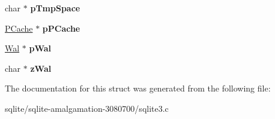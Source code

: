 \begin{DoxyCompactItemize}
\item 
\hypertarget{struct_pager_a64934188c72599e0be9ae54d3fc1cc92}{char $\ast$ {\bfseries p\+Tmp\+Space}}\label{struct_pager_a64934188c72599e0be9ae54d3fc1cc92}

\item 
\hypertarget{struct_pager_ae2495e45e354e92a858144386f91cab3}{\hyperlink{struct_p_cache}{P\+Cache} $\ast$ {\bfseries p\+P\+Cache}}\label{struct_pager_ae2495e45e354e92a858144386f91cab3}

\item 
\hypertarget{struct_pager_a2c759424108248d8b08e6f400fab14dd}{\hyperlink{struct_wal}{Wal} $\ast$ {\bfseries p\+Wal}}\label{struct_pager_a2c759424108248d8b08e6f400fab14dd}

\item 
\hypertarget{struct_pager_ac63ab281e48f9ac8521b85c1a90475b3}{char $\ast$ {\bfseries z\+Wal}}\label{struct_pager_ac63ab281e48f9ac8521b85c1a90475b3}

\end{DoxyCompactItemize}


The documentation for this struct was generated from the following file\+:\begin{DoxyCompactItemize}
\item 
sqlite/sqlite-\/amalgamation-\/3080700/sqlite3.\+c\end{DoxyCompactItemize}
